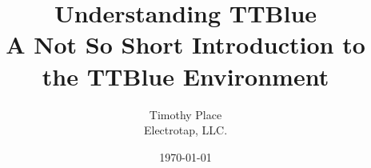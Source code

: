 \documentclass[10pt,a4paper]{book}
\begin{document}
\frontmatter


	
\title{\textbf{Understanding TTBlue}\\
A Not So Short Introduction to the TTBlue Environment}
\author{Timothy Place\\
Electrotap, LLC.}
\date{\today}
\maketitle



\tableofcontents

\mainmatter















\nocite{*}
\end{document}
